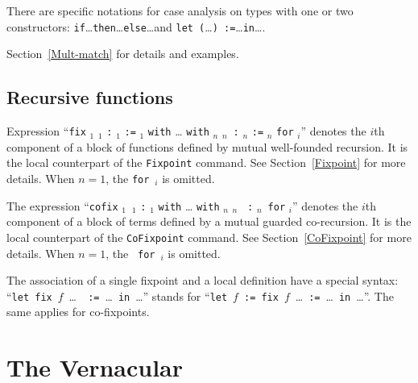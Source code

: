 There are specific notations for case analysis on types with one or
two constructors: {\tt if}\ldots{\tt then}\ldots{\tt else}\ldots and
{\tt let (}\ldots{\tt ) :=}\ldots{\tt in}\ldots. 

\SeeAlso Section~\ref{Mult-match} for details and examples.

\subsection{Recursive functions
\label{fixpoints}
}

Expression ``{\tt fix} \ident$_1$ \binder$_1$ {\tt :} {\type$_1$}
\texttt{:=} \term$_1$ {\tt with} {\ldots} {\tt with} \ident$_n$
\binder$_n$~{\tt :} {\type$_n$} \texttt{:=} \term$_n$ {\tt for}
{\ident$_i$}'' denotes the $i$th component of a block of functions
defined by mutual well-founded recursion. It is the local counterpart
of the {\tt Fixpoint} command. See Section~\ref{Fixpoint} for more
details. When $n=1$, the {\tt for}~{\ident$_i$} is omitted.

The expression ``{\tt cofix} \ident$_1$~\binder$_1$ {\tt :}
{\type$_1$} {\tt with} {\ldots} {\tt with} \ident$_n$ \binder$_n$ {\tt
:} {\type$_n$}~{\tt for} {\ident$_i$}'' denotes the $i$th component of
a block of terms defined by a mutual guarded co-recursion. It is the
local counterpart of the {\tt CoFixpoint} command. See
Section~\ref{CoFixpoint} for more details. When $n=1$, the {\tt
for}~{\ident$_i$} is omitted.

The association of a single fixpoint and a local
definition have a special syntax: ``{\tt let fix}~$f$~{\ldots}~{\tt
  :=}~{\ldots}~{\tt in}~{\ldots}'' stands for ``{\tt let}~$f$~{\tt :=
  fix}~$f$~\ldots~{\tt :=}~{\ldots}~{\tt in}~{\ldots}''. The same
  applies for co-fixpoints.


\section{The Vernacular
\label{Vernacular}}

